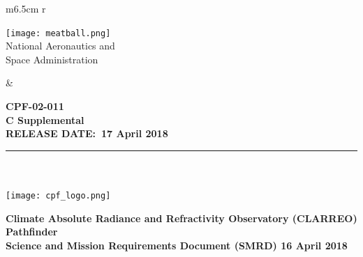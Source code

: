 \documentclass[12pt,oneside,oldfontcommands]{memoir}
\date[\mydate]{\today}
\title{\mycpftitle}
\author{\myauthor}
\date{\mydate}
\def\mytitle{Title}
\def\mytitle{Science and Mission Requirements Document (SMRD)}
\def\mydate{16 April 2018}
\def\releasedate{17 April 2018}
\def\documentnumber{CPF-02-011}
\def\titlepagerevision{REV. C}
\def\revision{C Supplemental }
\def\titlepagerevision{\revision}
\begin{document}


\mainmatter
\VerbatimFootnotes


%
%
\captionnamefont{\small\sffamily}
\captiontitlefont{\small\sffamily}
\renewcommand\thefigure{\thesection-\arabic{figure}} 
\renewcommand\thetable{\thesection-\arabic{table}}
%
%

% 

\thispagestyle{firststyle}
\sffamily
\setlength\voffset{-18pt}
\setlength{\floatsep}{10pt plus 1.0pt minus 2.0pt}
\vspace{-0.25in}
\begin{table}[h!]
  \begin{tabular}{ m{6.5cm} r }
    \begin{minipage}{4in}
      \texttt{[image: meatball.png]}\\
        \textsf{\noindent
        \footnotesize{National Aeronautics and\\
        \vspace{-5pt}Space Administration}
        }

    \end{minipage}
    &
    \begin{minipage}[t]{10cm}
    \vspace{0.3in}
    \sffamily
    \raggedleft\Large\bfseries \documentnumber\\
    \normalsize \MakeUppercase \titlepagerevision\\
    \raggedleft\bfseries
    RELEASE DATE:~\MakeTextUppercase\releasedate
    \end{minipage}
  \end{tabular}
\end{table}
\vspace{-0.3in}
\rule{\linewidth}{2.25pt}
~\\
~\\
\vspace{0.42in}
\centering
\texttt{[image: cpf\_logo.png]}

\Large\bfseries
	Climate Absolute Radiance and Refractivity Observatory (CLARREO) Pathfinder \\
\vspace{0.4in}
\mytitle
\normalsize
\vspace{0.25in}
\mydate \\
\normalfont
\vspace{0.05in}
\clearpage
\end{document}
